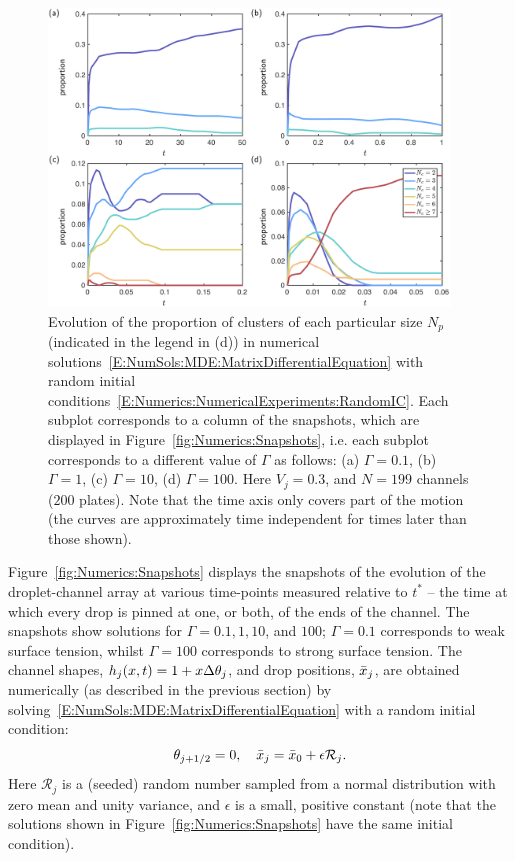 \begin{figure}[t]
\centering
\includegraphics[width = 0.95\textwidth]{ClusterSizes}
\caption{Evolution of the proportion of clusters of each particular size $N_p$ (indicated in the legend in (d)) in numerical solutions~\eqref{E:NumSols:MDE:MatrixDifferentialEquation} with random initial conditions~\eqref{E:Numerics:NumericalExperiments:RandomIC}. Each subplot corresponds to a column of the snapshots, which are displayed in Figure~\ref{fig:Numerics:Snapshots}, i.e. each subplot corresponds to a different value of $\Gamma$ as follows: (a) $\Gamma = 0.1$, (b) $\Gamma = 1$, (c) $\Gamma = 10$, (d) $\Gamma = 100$. Here $V_j = 0.3$, and $N=199$ channels ($200$ plates). Note that the time axis only covers part of the motion (the curves are approximately time independent for times later than those shown).}
\label{fig:Numerics:ClusterSizes}
\end{figure}


Figure~\ref{fig:Numerics:Snapshots} displays the snapshots of the evolution of the droplet-channel array at various time-points measured relative to $t^*$ -- the time at which every drop is pinned at one, or both, of the ends of the channel. The snapshots show solutions for $\Gamma = 0.1, 1, 10$, and $100$; $\Gamma = 0.1$ corresponds to weak surface tension, whilst $\Gamma = 100$ corresponds to strong surface tension. The channel shapes, $h_j(x,t) = 1 + x\Delta \theta_j$, and drop positions, $\bar{x}_j$, are obtained numerically (as described in the previous section) by solving~\eqref{E:NumSols:MDE:MatrixDifferentialEquation} with a random initial condition:
\begin{equation}\label{E:Numerics:NumericalExperiments:RandomIC}
\theta_{j+1/2} = 0, \quad \bar{x}_j = \bar{x}_0 + \epsilon \mathcal{R}_j.
\end{equation}
Here $\mathcal{R}_j$ is a (seeded) random number sampled from a normal distribution with zero mean and unity variance, and $\epsilon$ is a small, positive constant (note that the solutions shown in Figure~\ref{fig:Numerics:Snapshots} have the same initial condition).

